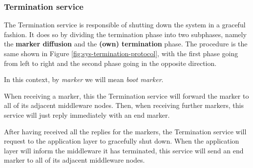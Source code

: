 \subsubsection{Termination service}\label{sec:mw-termination-descr}

The Termination service is responsible of shutting down the system in a
graceful fashion.
It does so by dividing the termination phase into two subphases, namely the
\textbf{marker diffusion} and the \textbf{(own) termination} phase. The
procedure is the same shown in Figure \ref{fig:sys-termination-protocol}, with
the first phase going from left to right and the second phase going in the
opposite direction.

In this context, by \textit{marker} we will mean \textit{boot marker}.

When receiving a marker, this the Termination service will forward the marker
to all of its adjacent middleware nodes.
Then, when receiving further markers, this service will just reply immediately
with an end marker.

After having received all the replies for the markers, the Termination service
will request to the application layer to gracefully shut down.
When the application layer will inform the middleware it has terminated, this
service will send an end marker to all of its adjacent middleware nodes.
